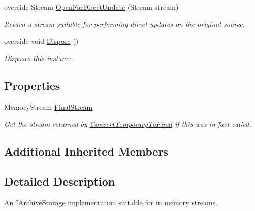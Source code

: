 \begin{DoxyCompactItemize}
override Stream \hyperlink{class_i_c_sharp_code_1_1_sharp_zip_lib_1_1_zip_1_1_memory_archive_storage_af536ce3c423efbc86e645382bc588deb}{Open\+For\+Direct\+Update} (Stream stream)
\begin{DoxyCompactList}\small\item\em Return a stream suitable for performing direct updates on the original source. \end{DoxyCompactList}\item 
override void \hyperlink{class_i_c_sharp_code_1_1_sharp_zip_lib_1_1_zip_1_1_memory_archive_storage_acb1d6118fd6a693de793dd704b641ecc}{Dispose} ()
\begin{DoxyCompactList}\small\item\em Disposes this instance. \end{DoxyCompactList}\end{DoxyCompactItemize}
\subsection*{Properties}
\begin{DoxyCompactItemize}
\item 
Memory\+Stream \hyperlink{class_i_c_sharp_code_1_1_sharp_zip_lib_1_1_zip_1_1_memory_archive_storage_a499d25545be9abbe3d09a796fa628160}{Final\+Stream}
\begin{DoxyCompactList}\small\item\em Get the stream returned by \hyperlink{class_i_c_sharp_code_1_1_sharp_zip_lib_1_1_zip_1_1_memory_archive_storage_a15c32e570f6ac74b5909cae3e22d84f4}{Convert\+Temporary\+To\+Final} if this was in fact called. \end{DoxyCompactList}\end{DoxyCompactItemize}
\subsection*{Additional Inherited Members}


\subsection{Detailed Description}
An \hyperlink{interface_i_c_sharp_code_1_1_sharp_zip_lib_1_1_zip_1_1_i_archive_storage}{I\+Archive\+Storage} implementation suitable for in memory streams. 



